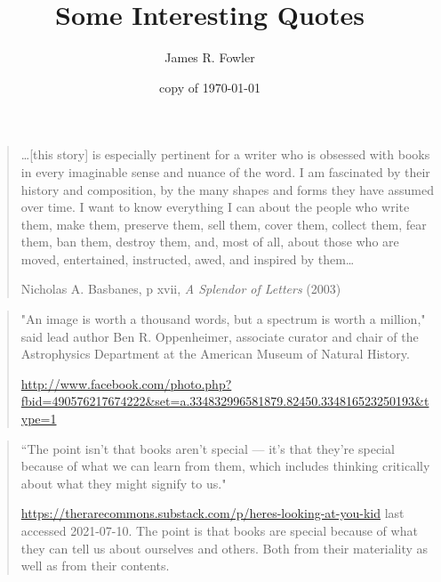 \documentclass{article}
\begin{document}
\title{Some Interesting Quotes}
\author{James R. Fowler}
\date{copy of \today}
\maketitle

\begin{quote}

\ldots [this story] is especially pertinent for a writer who is
obsessed with books in every imaginable sense and nuance of the
word. I am fascinated by their history and composition, by the many
shapes and forms they have assumed over time. I want to know
everything I can about the people who write them, make them, preserve
them, sell them, cover them, collect them, fear them, ban them,
destroy them, and, most of all, about those who are moved,
entertained, instructed, awed, and inspired by them\ldots

         Nicholas A. Basbanes, p xvii, {\it A Splendor of Letters} (2003)\cite{Basbanes2003}
\end{quote}


\begin{quote}

"An image is worth a thousand words, but a spectrum is worth a
million," said lead author Ben R. Oppenheimer, associate curator and
chair of the Astrophysics Department at the American Museum of
Natural History.

 \url{http://www.facebook.com/photo.php?fbid=490576217674222&set=a.334832996581879.82450.334816523250193&type=1}
\end{quote}

\begin{quote}
  ``The point isn't that books aren't special --- it's that they're special
  because of what we can learn from them, which includes thinking critically
  about what they might signify to us."

  \url{https://therarecommons.substack.com/p/heres-looking-at-you-kid}
  last accessed 2021-07-10. The point is that books are special
  because of what they can tell us about ourselves and others.  Both
  from their materiality as well as from their contents.
\end{quote}

\printbibliography
\end{document}
